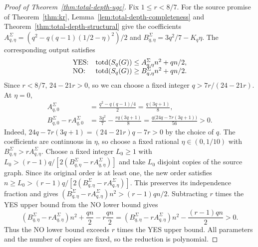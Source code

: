 \begin{proof}[Proof of Theorem~\ref{thm:total-depth-ugc}]
Fix $1\leq r<8/7$. For the source promise of Theorem~\ref{thm:kr},
Lemma~\ref{lem:total-depth-completeness} and
Theorem~\ref{thm:total-depth-structural} give the coefficients
$A^{\Sigma}_{q,\eta}=(q^2-q(q-1)(1/2-\eta)^2)/2$ and
$B^{\Sigma}_{q,\eta}=3q^2/7-K_q\eta$.
The corresponding output satisfies
\[
 \begin{array}{ll}
 \textup{YES:}&\operatorname{totd}(S_q(G))\leq A^{\Sigma}_{q,\eta}n^2+qn/2,\\
 \textup{NO:}&\operatorname{totd}(S_q(G))\geq B^{\Sigma}_{q,\eta}n^2+qn/2.
 \end{array}
\]
Since $r<8/7$, $24-21r>0$, so we can choose a fixed integer
$q>7r/(24-21r)$. At $\eta=0$,
\[
\begin{aligned}
 A^{\Sigma}_{q,0}
 &=\frac{q^2-q(q-1)/4}{2}=\frac{q(3q+1)}8,\\
 B^{\Sigma}_{q,0}-rA^{\Sigma}_{q,0}
 &=\frac{3q^2}{7}-\frac{rq(3q+1)}8
   =\frac{q\bigl(24q-7r(3q+1)\bigr)}{56}>0.
\end{aligned}
\]
Indeed,
$24q-7r(3q+1)=(24-21r)q-7r>0$ by the choice of $q$.
The coefficients are continuous in $\eta$, so choose a fixed rational
$\eta\in(0,1/10)$ with
$B^{\Sigma}_{q,\eta}>rA^{\Sigma}_{q,\eta}$. Choose a fixed integer
$L_0\ge1$ with
$L_0>(r-1)q/[2(B^{\Sigma}_{q,\eta}-rA^{\Sigma}_{q,\eta})]$ and take
$L_0$ disjoint copies of the source graph. Since its original order is
at least one, the new order satisfies
$n\ge L_0>(r-1)q/[2(B^{\Sigma}_{q,\eta}-rA^{\Sigma}_{q,\eta})]$.
This preserves its independence fraction and gives
$(B^{\Sigma}_{q,\eta}-rA^{\Sigma}_{q,\eta})n^2>(r-1)qn/2$.
Subtracting $r$ times the YES upper bound from the NO lower bound gives
\[
 (B^{\Sigma}_{q,\eta}-rA^{\Sigma}_{q,\eta})n^2
 +\frac{qn}{2}-r\frac{qn}{2}
 =(B^{\Sigma}_{q,\eta}-rA^{\Sigma}_{q,\eta})n^2
  -\frac{(r-1)qn}{2}>0.
\]
Thus the NO lower bound exceeds $r$ times the YES upper bound.
All parameters and the number of copies are fixed, so the reduction
is polynomial.
\end{proof}

